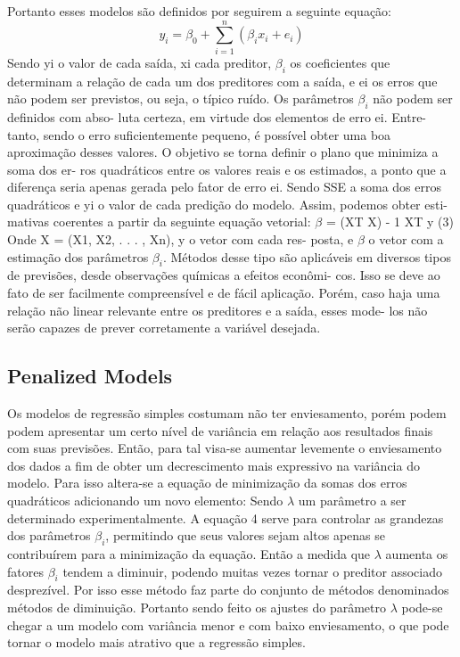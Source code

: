 Portanto esses modelos são definidos por seguirem a
seguinte equação:
\begin{equation}
  y_i = \beta_0 + \sum_{i=1}^n(\beta_i x_i + e_i)
\end{equation}
Sendo yi o valor de cada saída, xi cada preditor, $\beta_i$ os
coeficientes que determinam a relação de cada um dos
preditores com a saída, e ei os erros que não podem ser
previstos, ou seja, o típico ruído.
Os parâmetros $\beta_i$ não podem ser definidos com abso-
luta certeza, em virtude dos elementos de erro ei. Entre-
tanto, sendo o erro suficientemente pequeno, é possível
obter uma boa aproximação desses valores. O objetivo
se torna definir o plano que minimiza a soma dos er-
ros quadráticos entre os valores reais e os estimados, a
ponto que a diferença seria apenas gerada pelo fator de
erro ei.
Sendo SSE a soma dos erros quadráticos e yi o valor de
cada predição do modelo. Assim, podemos obter esti-
mativas coerentes a partir da seguinte equação vetorial:
$\beta$ = (XT X) - 1 XT y (3)
Onde X = (X1, X2, . . . , Xn), y o vetor com cada res-
posta, e $\beta$ o vetor com a estimação dos parâmetros $\beta_i$.
Métodos desse tipo são aplicáveis em diversos tipos de
previsões, desde observações químicas a efeitos econômi-
cos. Isso se deve ao fato de ser facilmente compreensível
e de fácil aplicação. Porém, caso haja uma relação não
linear relevante entre os preditores e a saída, esses mode-
los não serão capazes de prever corretamente a variável
desejada.


\subsection{Penalized Models}
Os modelos de regressão simples costumam não ter enviesamento, porém podem podem apresentar um certo nível de variância em relação aos resultados finais com suas previsões. Então, para tal visa-se aumentar levemente o enviesamento dos dados a fim de obter um decrescimento mais expressivo na variância do modelo. Para isso altera-se a equação de minimização da somas dos erros quadráticos adicionando um novo elemento: 
Sendo $\lambda$ um parâmetro a ser determinado experimentalmente. A equação 4 serve para controlar as grandezas dos parâmetros  $\beta_i$, permitindo que seus valores sejam altos apenas se contribuírem para a minimização da equação. Então a medida que $\lambda$ aumenta os fatores  $\beta_i$ tendem a diminuir, podendo muitas vezes tornar o preditor associado desprezível. Por isso esse método faz parte do conjunto de métodos denominados métodos de diminuição. Portanto sendo feito os ajustes do parâmetro $\lambda$ pode-se chegar a um modelo com variância menor e com baixo enviesamento, o que pode tornar o modelo mais atrativo que a regressão simples.

